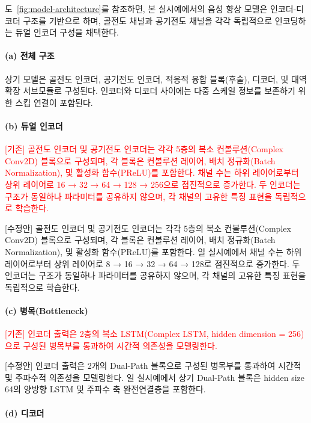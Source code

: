 \documentclass{article}
\newcommand{\reviewold}[1]{{\par\noindent\textcolor{red}{[기존] #1}}}
\newcommand{\reviewnew}[1]{{\par\noindent\textcolor{customblue}{[수정안] #1}}}
\newcommand{\reviewpair}[2]{\reviewold{#1}\reviewnew{#2}\par}
\begin{document}
도~\ref{fig:model-architecture}를 참조하면, 본 실시예에서의 음성 향상 모델은 인코더-디코더 구조를 기반으로 하며, 골전도 채널과 공기전도 채널을 각각 독립적으로 인코딩하는 듀얼 인코더 구성을 채택한다.

\paragraph{(a) 전체 구조}

상기 모델은 골전도 인코더, 공기전도 인코더, 적응적 융합 블록(후술), 디코더, 및 대역 확장 서브모듈로 구성된다. 인코더와 디코더 사이에는 다중 스케일 정보를 보존하기 위한 스킵 연결이 포함된다.

\paragraph{(b) 듀얼 인코더}

\reviewpair{골전도 인코더 및 공기전도 인코더는 각각 5층의 복소 컨볼루션(Complex Conv2D) 블록으로 구성되며, 각 블록은 컨볼루션 레이어, 배치 정규화(Batch Normalization), 및 활성화 함수(PReLU)를 포함한다. 채널 수는 하위 레이어로부터 상위 레이어로 16 → 32 → 64 → 128 → 256으로 점진적으로 증가한다. 두 인코더는 구조가 동일하나 파라미터를 공유하지 않으며, 각 채널의 고유한 특징 표현을 독립적으로 학습한다.}{골전도 인코더 및 공기전도 인코더는 각각 5층의 복소 컨볼루션(Complex Conv2D) 블록으로 구성되며, 각 블록은 컨볼루션 레이어, 배치 정규화(Batch Normalization), 및 활성화 함수(PReLU)를 포함한다. 일 실시예에서 채널 수는 하위 레이어로부터 상위 레이어로 8 → 16 → 32 → 64 → 128로 점진적으로 증가한다. 두 인코더는 구조가 동일하나 파라미터를 공유하지 않으며, 각 채널의 고유한 특징 표현을 독립적으로 학습한다.}

\paragraph{(c) 병목(Bottleneck)}

\reviewpair{인코더 출력은 2층의 복소 LSTM(Complex LSTM, hidden dimension = 256)으로 구성된 병목부를 통과하여 시간적 의존성을 모델링한다.}{인코더 출력은 2개의 Dual-Path 블록으로 구성된 병목부를 통과하여 시간적 및 주파수적 의존성을 모델링한다. 일 실시예에서 상기 Dual-Path 블록은 hidden size 64의 양방향 LSTM 및 주파수 축 완전연결층을 포함한다.}

\paragraph{(d) 디코더}
\end{document}
